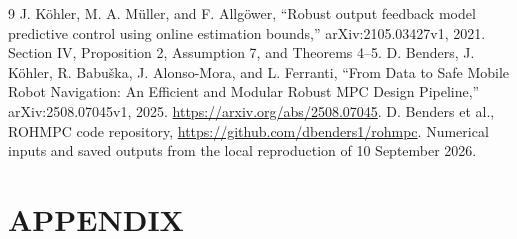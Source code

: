 \documentclass[11pt,a4paper]{article}
\numberwithin{equation}{section}
\renewcommand{\thesection}{\Roman{section}}
\theoremstyle{remark}\newtheorem{remark}{Remark}
\begin{document}
\begin{thebibliography}{9}
 J. K\"ohler, M. A. M\"uller, and F. Allg\"ower,
``Robust output feedback model predictive control using online estimation bounds,''
arXiv:2105.03427v1, 2021. Section IV, Proposition 2, Assumption 7, and Theorems 4--5.
 D. Benders, J. K\"ohler, R. Babu\v{s}ka, J. Alonso-Mora, and L. Ferranti,
``From Data to Safe Mobile Robot Navigation: An Efficient and Modular Robust MPC Design Pipeline,''
arXiv:2508.07045v1, 2025. \url{https://arxiv.org/abs/2508.07045}.
 D. Benders et al., ROHMPC code repository,
\url{https://github.com/dbenders1/rohmpc}. Numerical inputs and saved outputs from the local reproduction of 10 September 2026.
\end{thebibliography}

\clearpage
\appendix
\section*{APPENDIX}
\renewcommand{\thesection}{\Alph{section}}
\end{document}
